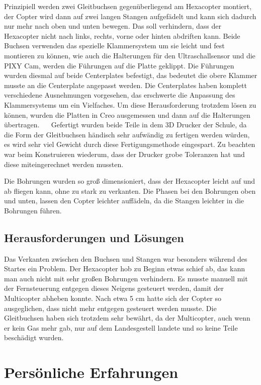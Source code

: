 	Prinzipiell werden zwei Gleitbuchsen gegenüberliegend am Hexacopter montiert, der Copter wird dann auf zwei langen Stangen aufgefädelt und kann sich dadurch nur mehr nach oben und unten bewegen.
	Das soll verhindern, dass der Hexacopter nicht nach links, rechts, vorne oder hinten abdriften kann.
	Beide Buchsen verwenden das spezielle Klammersystem um sie leicht und fest montieren zu können, wie auch die Halterungen für den Ultraschallsensor und die PIXY Cam, werden die Führungen auf die Platte geklippt.
	Die Führungen wurden diesmal auf beide Centerplates befestigt, das bedeutet die obere Klammer musste an die Centerplate angepasst werden.
	Die Centerplates haben komplett verschiedene Ausnehmungen vorgesehen, das erschwerte die Anpassung des Klammersystems um ein Vielfaches.
	Um diese Herausforderung trotzdem lösen zu können, wurden die Platten in Creo ausgemessen und dann auf die Halterungen übertragen.
		 
	Gefertigt wurden beide Teile in dem 3D Drucker der Schule, da die Form der Gleitbuchsen händisch sehr aufwändig zu fertigen werden würden, \bzw es wird sehr viel Gewicht durch diese Fertigungsmethode eingespart.
	Zu beachten war beim Konstruieren wiederum, dass der Drucker grobe Toleranzen hat und diese miteingerechnet werden mussten.

	Die Bohrungen wurden so groß dimensioniert, dass der Hexacopter leicht auf und ab fliegen kann, ohne zu stark zu verkanten.
	Die Phasen bei den Bohrungen oben und unten, lassen den Copter leichter auffädeln, da die Stangen leichter in die Bohrungen führen.

	\subsection{Herausforderungen und Lösungen}

	Das Verkanten zwischen den Buchsen und Stangen war besonders während des Startes ein Problem.
	Der Hexacopter hob zu Beginn etwas  schief ab, das kann man auch nicht mit sehr großen Bohrungen verhindern.
	Es musste manuell mit der Fernsteuerung entgegen dieses Neigens gesteuert werden, damit der Multicopter abheben konnte.
	Nach etwa 5 cm hatte sich der Copter so ausgeglichen, dass nicht mehr entgegen gesteuert werden musste.
	Die Gleitbuchsen haben sich trotzdem sehr bewährt, da der Multicopter, auch wenn er kein Gas mehr gab, nur auf dem Landesgestell landete und so keine Teile beschädigt wurden.

\section{Persönliche Erfahrungen}
